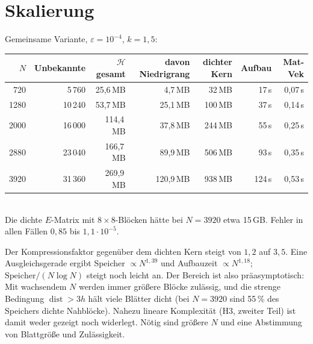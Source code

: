 \documentclass[11pt, a4paper]{article}
\begin{document}
\section{Skalierung}
Gemeinsame Variante, $\varepsilon=10^{-4}$, $k=1{,}5$:
\begin{center}\small
\begin{tabular}{rrrrrrr}
\toprule
$N$ & Unbekannte & $\mathcal{H}$ gesamt & davon Niedrigrang & dichter Kern & Aufbau & Mat-Vek\\
\midrule
720 & 5\,760 & 25,6\,MB & 4,7\,MB & 32\,MB & 17\,s & 0,07\,s\\
1280 & 10\,240 & 53,7\,MB & 25,1\,MB & 100\,MB & 37\,s & 0,14\,s\\
2000 & 16\,000 & 114,4\,MB & 37,8\,MB & 244\,MB & 55\,s & 0,25\,s\\
2880 & 23\,040 & 166,7\,MB & 89,9\,MB & 506\,MB & 93\,s & 0,35\,s\\
3920 & 31\,360 & 269,9\,MB & 120,9\,MB & 938\,MB & 124\,s & 0,53\,s\\
\bottomrule
\end{tabular}\\[2pt]
{\footnotesize Die dichte $E$-Matrix mit $8\times8$-Blöcken hätte bei $N=3920$ etwa 15\,GB.
Fehler in allen Fällen $0{,}85$ bis $1{,}1\cdot10^{-5}$.}
\end{center}
Der Kompressionsfaktor gegenüber dem dichten Kern steigt von $1{,}2$ auf $3{,}5$. Eine
Ausgleichsgerade ergibt Speicher $\propto N^{1{,}39}$ und Aufbauzeit $\propto N^{1{,}18}$;
$\text{Speicher}/(N\log N)$ steigt noch leicht an. Der Bereich ist also präasymptotisch:
Mit wachsendem $N$ werden immer größere Blöcke zulässig, und die strenge Bedingung
$\operatorname{dist}>3h$ hält viele Blätter dicht (bei $N=3920$ sind 55\,\% des Speichers
dichte Nahblöcke). Nahezu lineare Komplexität (H3, zweiter Teil) ist damit weder
gezeigt noch widerlegt. Nötig sind größere $N$ und eine Abstimmung von Blattgröße und
Zulässigkeit.
\end{document}
